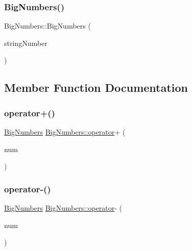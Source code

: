 \mbox{\label{class_big_numbers_a562e1ff5243ea548a60b1c116eaea975}} 
\subsubsection{\texorpdfstring{Big\+Numbers()}{BigNumbers()}\hspace{0.1cm}{\footnotesize\ttfamily [2/2]}}
{\footnotesize\ttfamily Big\+Numbers\+::\+Big\+Numbers (\begin{DoxyParamCaption}\item[{string}]{string\+Number }\end{DoxyParamCaption})\hspace{0.3cm}{\ttfamily [inline]}}



\subsection{Member Function Documentation}
\mbox{\label{class_big_numbers_a256473e2b7c3fe8dd1df1c62d38694df}} 
\subsubsection{\texorpdfstring{operator+()}{operator+()}}
{\footnotesize\ttfamily \mbox{\hyperlink{class_big_numbers}{Big\+Numbers}} \mbox{\hyperlink{_big_numbers_8cpp_a2ac03e034534288f7d6016ecb691cf76}{Big\+Numbers\+::operator}}+ (\begin{DoxyParamCaption}\item[{\mbox{\hyperlink{class_big_numbers}{Big\+Numbers}}}]{num }\end{DoxyParamCaption})\hspace{0.3cm}{\ttfamily [inline]}}

\mbox{\label{class_big_numbers_a1647a46658f8692595ab4222c89e0ef6}} 
\subsubsection{\texorpdfstring{operator-\/()}{operator-()}}
{\footnotesize\ttfamily \mbox{\hyperlink{class_big_numbers}{Big\+Numbers}} \mbox{\hyperlink{_big_numbers_8cpp_a2ac03e034534288f7d6016ecb691cf76}{Big\+Numbers\+::operator}}-\/ (\begin{DoxyParamCaption}\item[{\mbox{\hyperlink{class_big_numbers}{Big\+Numbers}}}]{num }\end{DoxyParamCaption})\hspace{0.3cm}{\ttfamily [inline]}}



